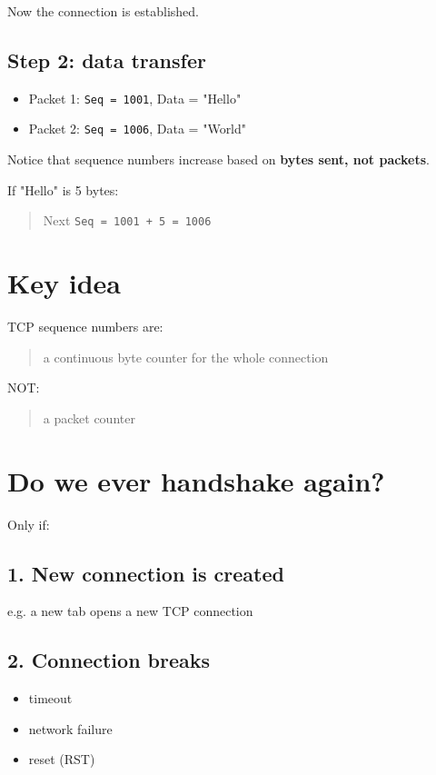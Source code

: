 Now the connection is established.

\subsection{Step 2: data transfer}

\begin{itemize}
    \item Packet 1: \texttt{Seq = 1001}, Data = "Hello"
    \item Packet 2: \texttt{Seq = 1006}, Data = "World"
\end{itemize}

Notice that sequence numbers increase based on \textbf{bytes sent, not packets}.

If "Hello" is 5 bytes:

\begin{quote}
Next \texttt{Seq = 1001 + 5 = 1006}
\end{quote}

\section{Key idea}

TCP sequence numbers are:

\begin{quote}
a continuous byte counter for the whole connection
\end{quote}

NOT:

\begin{quote}
a packet counter
\end{quote}

\section{Do we ever handshake again?}

Only if:

\subsection{1. New connection is created}
e.g. a new tab opens a new TCP connection

\subsection{2. Connection breaks}
\begin{itemize}
    \item timeout
    \item network failure
    \item reset (RST)
\end{itemize}

